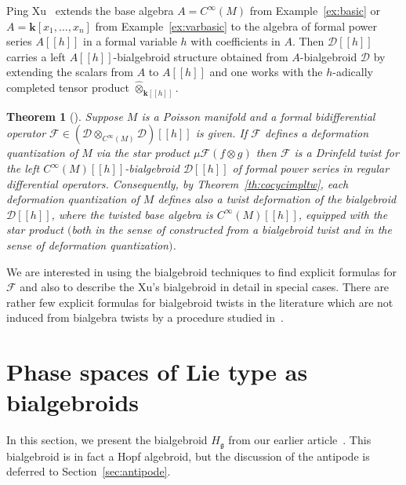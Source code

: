 \documentclass[pdftex]{sigma}
\def\genfd{\mathbf{k}}
\def\gg{\mathfrak{g}}
\newtheorem{Theorem}{Theorem}[section]
\numberwithin{equation}{section}
\begin{document}
\begin{Example}\label{ex:defquant} Ping Xu~\cite{xu} extends the base algebra $A = C^\infty(M)$
from Example~\ref{ex:basic} or $A = \genfd[x_1,\dots,x_n]$ from Example~\ref{ex:varbasic} to the algebra of formal power series $A[[h]]$ in a formal variable $h$ with coefficients in $A$. Then $\mathcal{D}[[h]]$ carries a left $A[[h]]$-bialgebroid structure obtained from $A$-bialgebroid $\mathcal{D}$ by extending the scalars from $A$ to $A[[h]]$ and one works with the $h$-adically completed tensor product $\hat\otimes_{\genfd[[h]]}$.
\end{Example}

\begin{Theorem}[\cite{xu}]\label{thm:defqinterp}
Suppose $M$ is a Poisson manifold and a formal bidifferential operator $\mathcal{F} \in (\mathcal{D}\otimes_{C^\infty(M)}\mathcal{D})[[h]]$ is given. If $\mathcal{F}$ defines a deformation quantization of $M$ via the star product $\mu\mathcal{F}(f\otimes g)$ then $\mathcal{F}$ is a Drinfeld twist for the left $C^\infty(M)[[h]]$-bialgebroid $\mathcal{D}[[h]]$ of formal power series in regular differential operators. Consequently, by Theorem~{\rm \ref{th:cocycimpltw}}, each deformation quantization of $M$ defines also a twist deformation of the bialgebroid $\mathcal{D}[[h]]$, where the twisted base algebra is $C^\infty(M)[[h]]$, equipped with the star product $($both in the sense of constructed from a bialgebroid twist and in the sense of deformation quantization$)$.
\end{Theorem}
We are interested in using the bialgebroid techniques to find explicit formulas for $\mathcal{F}$ and also to describe the Xu's bialgebroid in detail in special cases. There are rather few explicit formulas for bialgebroid twists in the literature which are not induced from bialgebra twists
by a procedure studied in~\cite{borpacholtwistedoid}.

\section{Phase spaces of Lie type as bialgebroids}\label{s:repeathalg}

In this section, we present the bialgebroid $H_\gg$ from our earlier article~\cite{halg}. This bialgebroid is in fact a Hopf algebroid, but the discussion of the antipode is deferred to Section~\ref{sec:antipode}.
\end{document}
